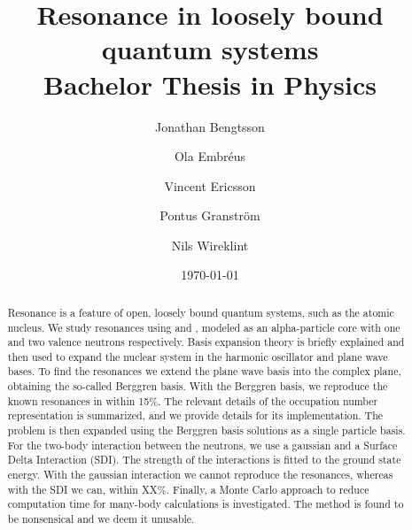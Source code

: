 \documentclass[12pt,a4paper]{report}
\begin{document}
  

\listoftodos


\title{Resonance in loosely bound quantum systems\\ 
\Large Bachelor Thesis in Physics}
\author{Jonathan Bengtsson \and Ola Embréus \and Vincent Ericsson \and Pontus Granström \and Nils Wireklint}
\date{\today}
\maketitle


\begin{abstract}
Resonance is a feature of open, loosely bound quantum systems, such as the atomic nucleus.
We study resonances using  and , modeled as an alpha-particle core with one and two valence neutrons respectively.
Basis expansion theory is briefly explained and then used to expand the nuclear system in the harmonic oscillator and plane wave bases.
To find the resonances we extend the plane wave basis into the complex plane, obtaining the so-called Berggren basis. 
With the Berggren basis, we reproduce the known resonances in  within 15\%.
The relevant details of the occupation number representation is summarized, and we provide details for its implementation.
The  problem is then expanded using the  Berggren basis solutions as a single particle basis. 
For the two-body interaction between the neutrons, we use a gaussian and a Surface Delta Interaction (SDI).
The strength of the interactions is fitted to the  ground state energy.
With the gaussian interaction we cannot reproduce the  resonances, whereas with the SDI we can, within XX\%.
Finally, a Monte Carlo approach to reduce computation time for many-body calculations is investigated.
The method is found to be nonsensical and we deem it unusable.

\end{abstract}

\tableofcontents










\end{document}
